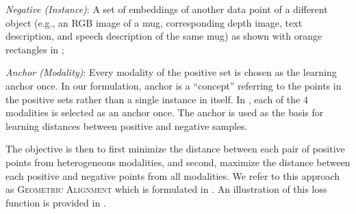 \documentclass[sigconf,natbib=true,anonymous=true]{acmart}
\newcommand{\todokd}[1]{\todo[color=red!20]{{\small #1 -- Kasra}}}
\newcommand{\geom}{\textsc{Geometric Alignment}}
\newcommand{\supcon}{\textsc{SupCon}}
\begin{document}
    \textit{Negative (Instance)}: A set of embeddings of another data point of a different object (e.g., an RGB image of a mug, corresponding depth image, text description, and speech description of the same mug) as shown with orange rectangles in ;
    
    \textit{Anchor (Modality)}: Every modality of the positive set is chosen as the learning anchor once. In our formulation, anchor is a ``concept'' referring to the points in the positive sets rather than a single instance in itself. In , each of the 4 modalities is selected as an anchor once.
    The anchor is used as the basis for learning distances between positive and negative samples.

The objective is then to first minimize the distance between each pair of positive points from heterogeneous modalities, and second, maximize the distance between each positive and negative points from all modalities.
We refer to this approach as \geom{} which is formulated in . An illustration of this loss function is provided in .
\end{document}
